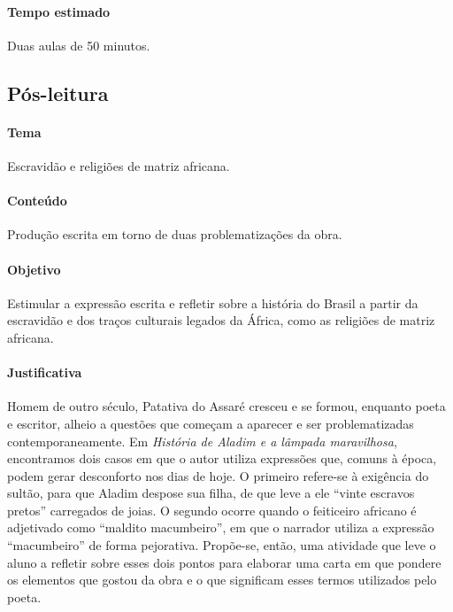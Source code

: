 \documentclass[11pt]{extarticle}
\begin{document}
\paragraph{Tempo estimado} Duas aulas de 50 minutos.




\subsection{Pós-leitura}


\paragraph{Tema} Escravidão e religiões de matriz africana.

\paragraph{Conteúdo} Produção escrita em torno de duas problematizações da obra.

\paragraph{Objetivo} Estimular a expressão escrita e refletir sobre a história do Brasil a partir da escravidão e dos traços culturais legados da África, como as religiões de matriz africana.

\paragraph{Justificativa} Homem de outro século, Patativa do Assaré cresceu e se formou, enquanto poeta e escritor, alheio a questões que começam a aparecer e ser problematizadas contemporaneamente. Em \textit{História de Aladim e a lâmpada maravilhosa}, encontramos dois casos em que o autor utiliza expressões que, comuns à época, podem gerar desconforto nos dias de hoje. O primeiro refere-se à exigência do sultão, para que Aladim despose sua filha, de que leve a ele ``vinte escravos pretos'' carregados de joias. O segundo ocorre quando o feiticeiro africano é adjetivado como ``maldito macumbeiro'', em que o narrador utiliza a expressão ``macumbeiro'' de forma pejorativa.
Propõe-se, então, uma atividade que leve o aluno a refletir sobre esses dois pontos para elaborar uma carta em que pondere os elementos que gostou da obra e o que significam esses termos utilizados pelo poeta.
\end{document}
